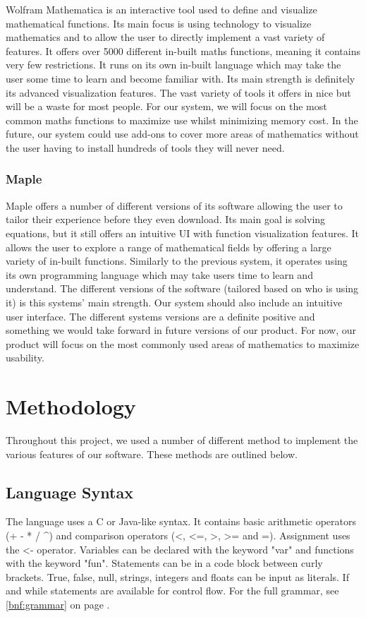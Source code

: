\documentclass[a4paper, oneside, 11pt]{report}
\begin{document}
Wolfram Mathematica is an interactive tool used to define and visualize mathematical functions. Its main focus is using technology to visualize mathematics and to allow the user to directly implement a vast variety of features. It offers over 5000 different in-built maths functions, meaning it contains very few restrictions. It runs on its own in-built language which may take the user some time to learn and become familiar with. Its main strength is definitely its advanced visualization features.
The vast variety of tools it offers in nice but will be a waste for most people. For our system, we will focus on the most common maths functions to maximize use whilst minimizing memory cost. In the future, our system could use add-ons to cover more areas of mathematics without the user having to install hundreds of tools they will never need.


\subsection{Maple\cite{Maple}}

Maple offers a number of different versions of its software allowing the user to tailor their experience before they even download. Its main goal is solving equations, but it still offers an intuitive UI with function visualization features. It allows the user to explore a range of mathematical fields by offering a large variety of in-built functions. Similarly to the previous system, it operates using its own programming language which may take users time to learn and understand. The different versions of the software (tailored based on who is using it) is this systems' main strength.
Our system should also include an intuitive user interface. The different systems versions are a definite positive and something we would take forward in future versions of our product. For now, our product will focus on the most commonly used areas of mathematics to maximize usability.


\chapter{Methodology}

Throughout this project, we used a number of different method to implement the various features of our software. These methods are outlined below.

\section{Language Syntax}
The language uses a C or Java-like syntax. It contains basic arithmetic operators (+ - * / \textasciicircum) and comparison operators (\textless, \textless=, \textgreater, \textgreater= and =). Assignment uses the \textless- operator.
Variables can be declared with the keyword "var" and functions with the keyword "fun". Statements can be in a code block between curly brackets. True, false, null, strings, integers and floats can be input as literals. If and while statements are 
available for control flow.
For the full grammar, see \ref{bnf:grammar} on page \pageref{bnf:grammar}.
\end{document}
